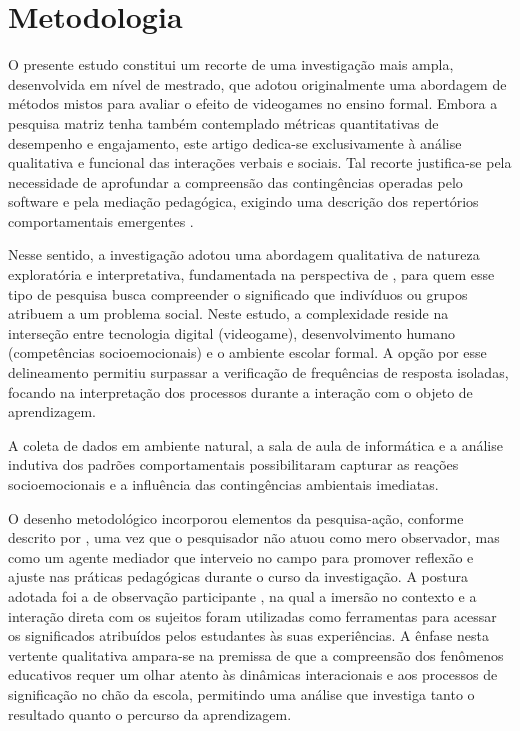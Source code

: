 \documentclass[portuguese]{textolivre}
\begin{document}
\section{Metodologia}

O presente estudo constitui um recorte de uma investigação mais ampla, desenvolvida em nível de mestrado, que adotou originalmente uma abordagem de métodos mistos para avaliar o efeito de videogames no ensino formal. Embora a pesquisa matriz tenha também contemplado métricas quantitativas de desempenho e engajamento, este artigo dedica-se exclusivamente à análise qualitativa e funcional das interações verbais e sociais. Tal recorte justifica-se pela necessidade de aprofundar a compreensão das contingências operadas pelo software e pela mediação pedagógica, exigindo uma descrição dos repertórios comportamentais emergentes \cite{skinner1972tecnologia,skinner1974behaviorismo,skinner1978comportamentoverbal}.

Nesse sentido, a investigação adotou uma abordagem qualitativa de natureza exploratória e interpretativa, fundamentada na perspectiva de \textcite{creswell2017research}, para quem esse tipo de pesquisa busca compreender o significado que indivíduos ou grupos atribuem a um problema social. Neste estudo, a complexidade reside na interseção entre tecnologia digital (videogame), desenvolvimento humano (competências socioemocionais) e o ambiente escolar formal. A opção por esse delineamento permitiu surpassar a verificação de frequências de resposta isoladas, focando na interpretação dos processos durante a interação com o objeto de aprendizagem.

A coleta de dados em ambiente natural, a sala de aula de informática e a análise indutiva dos padrões comportamentais possibilitaram capturar as reações socioemocionais e a influência das contingências ambientais imediatas.

O desenho metodológico incorporou elementos da pesquisa-ação, conforme descrito por \textcite{kemmis1988action,tripp2005pesquisa}, uma vez que o pesquisador não atuou como mero observador, mas como um agente mediador que interveio no campo para promover reflexão e ajuste nas práticas pedagógicas durante o curso da investigação. A postura adotada foi a de observação participante \cite{marques2016observacao}, na qual a imersão no contexto e a interação direta com os sujeitos foram utilizadas como ferramentas para acessar os significados atribuídos pelos estudantes às suas experiências. A ênfase nesta vertente qualitativa ampara-se na premissa de que a compreensão dos fenômenos educativos requer um olhar atento às dinâmicas interacionais e aos processos de significação no chão da escola, permitindo uma análise que investiga tanto o resultado quanto o percurso da aprendizagem.
\end{document}
